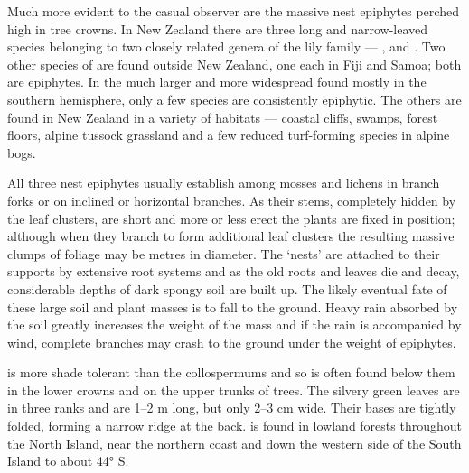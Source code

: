 Much more evident to the casual observer are the massive nest epiphytes perched high in tree crowns.
In New Zealand there are three long and narrow-leaved species belonging to two closely related genera of the lily family --- ,  and .
Two other species of  are found outside New Zealand, one each in Fiji and Samoa; both are epiphytes.
In the much larger and more widespread  found mostly in the southern hemisphere, only a few species are consistently epiphytic.
The others are found in New Zealand in a variety of habitats --- coastal cliffs, swamps, forest floors, alpine tussock grassland and a few reduced turf-forming species in alpine bogs.

All three nest epiphytes usually establish among mosses and lichens in branch forks or on inclined or horizontal branches.
As their stems, completely hidden by the leaf clusters, are short and more or less erect the plants are fixed in position; although when they branch to form additional leaf clusters the resulting massive clumps of foliage may be metres in diameter.
The `nests' are attached to their supports by extensive root systems and as the old roots and leaves die and decay, considerable depths of dark spongy soil are built up.
The likely eventual fate of these large soil and plant masses is to fall to the ground.
Heavy rain absorbed by the soil greatly increases the weight of the mass and if the rain is accompanied by wind, complete branches may crash to the ground under the weight of epiphytes.

 is more shade tolerant than the collospermums and so is often found below them in the lower crowns and on the upper trunks of trees.
The silvery green leaves are in three ranks and are 1–2 m long, but only 2--3 cm wide.
Their bases are tightly folded, forming a narrow ridge at the back.  is found in lowland forests throughout the North Island, near the northern coast and down the western side of the South Island to about 44° S.

